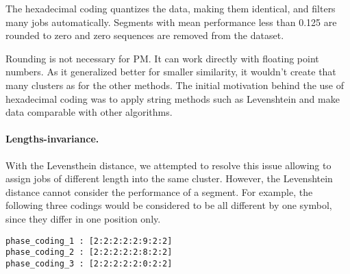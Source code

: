 \documentclass{jhps}
\begin{document}
The hexadecimal coding quantizes the data, making them identical, and filters many jobs automatically.
Segments with mean performance less than 0.125 are rounded to zero and zero sequences are removed from the dataset.

Rounding is not necessary for PM.
It can work directly with floating point numbers.
As it generalized better for smaller similarity, it wouldn't create that many clusters as for the other methods.
The initial motivation behind the use of hexadecimal coding was to apply string methods such as Levenshtein and make data comparable with other algorithms.



\medskip

\paragraph{Lengths-invariance.}
With the Levensthein distance, we attempted to resolve this issue allowing to assign jobs of different length into the same cluster.
However, the Levenshtein distance cannot consider the performance of a segment.
For example, the following three codings would be considered to be all different by one symbol, since they differ in one position only.

\begin{lstlisting}
phase_coding_1 : [2:2:2:2:2:9:2:2]
phase_coding_2 : [2:2:2:2:2:8:2:2]
phase_coding_3 : [2:2:2:2:2:0:2:2]
\end{lstlisting}
\end{document}
